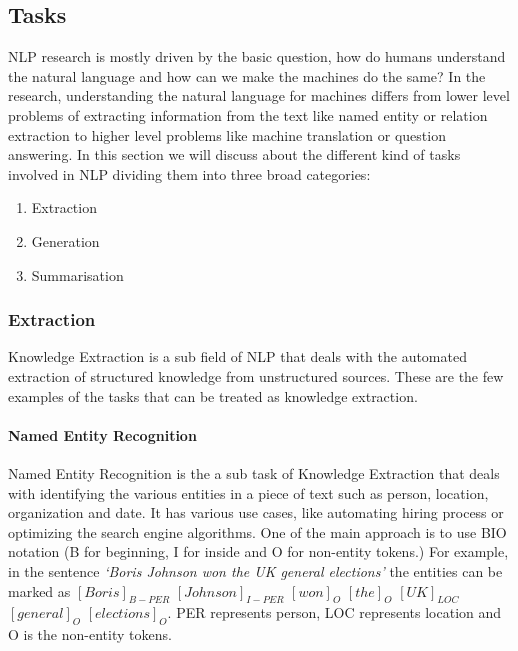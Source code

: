 \subsection{Tasks}\label{sec:tasks}
NLP research is mostly driven by the basic question, how do humans understand the natural language and how can we make the machines do the same? In the research, understanding the natural language for machines differs from lower level problems of extracting information from the text like named entity or relation extraction to higher level problems like machine translation or question answering. In this section we will discuss about the different kind of tasks involved in NLP dividing them into three broad categories:

\begin{enumerate}
    \item Extraction
    \item Generation
    \item Summarisation
\end{enumerate}

\subsubsection{Extraction}
Knowledge Extraction is a sub field of NLP that deals with the automated extraction of structured knowledge from unstructured sources. These are the few examples of the tasks that can be treated as knowledge extraction.

\paragraph{Named Entity Recognition}
Named Entity Recognition is the a sub task of Knowledge Extraction that deals with identifying the various entities in a piece of text such as person, location, organization and date. It has various use cases, like automating hiring process or optimizing the search engine algorithms. One of the main approach is to use BIO notation (B for beginning, I for inside and O for non-entity tokens.) For example, in the sentence \textit{`Boris Johnson won the UK general elections'} the entities can be marked as $[Boris]_{B-PER}$ $[Johnson]_{I-PER}$ $[won]_{O}$ $[the]_{O}$ $[UK]_{LOC}$ $[general]_{O}$ $[elections]_{O}$. PER represents person, LOC represents location and O is the non-entity tokens.

